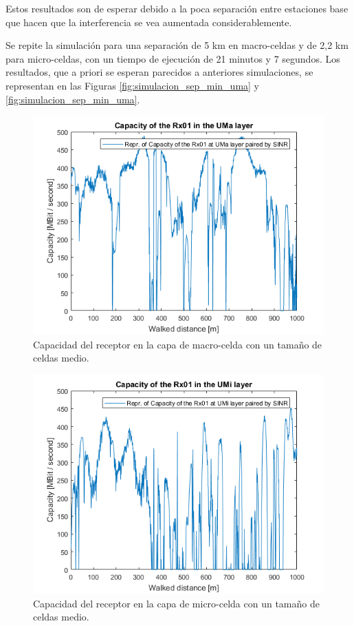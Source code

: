 Estos resultados son de esperar debido a la poca separación entre estaciones base que hacen que la interferencia se vea aumentada considerablemente.

Se repite la simulación para una separación de 5 km en macro-celdas y de 2,2 km para micro-celdas, con un tiempo de ejecución de 21 minutos y 7 segundos. Los resultados, que a priori se esperan parecidos a anteriores simulaciones, se representan en las Figuras \ref{fig:simulacion_sep_min_uma} y \ref{fig:simulacion_sep_min_uma}.

\begin{figure}[h!]
	\centering
    \includegraphics[width=0.8\linewidth]{imagenes/6_5_capacidad_uma_med.png}
	\caption{Capacidad del receptor en la capa de macro-celda con un tamaño de celdas medio.}
	\label{fig:simulacion_sep_med_uma}
\end{figure}

\begin{figure}[h!]
	\centering
    \includegraphics[width=0.8\linewidth]{imagenes/6_5_capacidad_umi_med.png}
	\caption{Capacidad del receptor en la capa de micro-celda con un tamaño de celdas medio.}
	\label{fig:simulacion_sep_med_umi}
\end{figure}

